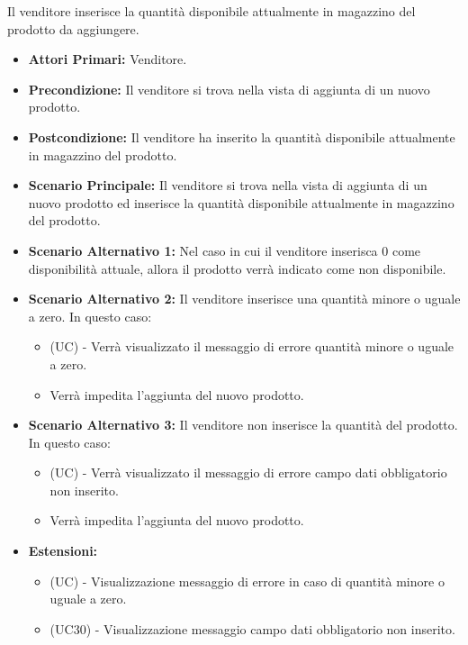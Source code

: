 Il venditore inserisce la quantità disponibile attualmente in magazzino del prodotto da aggiungere.
\begin{itemize}
    \item \textbf{Attori Primari:} Venditore.
    \item \textbf{Precondizione:} Il venditore si trova nella vista di aggiunta di un nuovo prodotto.
    \item \textbf{Postcondizione:} Il venditore ha inserito la quantità disponibile attualmente in magazzino del prodotto.
    \item \textbf{Scenario Principale:} Il venditore si trova nella vista di aggiunta di un nuovo prodotto ed inserisce la quantità disponibile attualmente in magazzino del prodotto.
    \item \textbf{Scenario Alternativo 1:} Nel caso in cui il venditore inserisca 0 come disponibilità attuale, allora il prodotto verrà indicato come non disponibile.
    \item \textbf{Scenario Alternativo 2:} Il venditore inserisce una quantità minore o uguale a zero. In questo caso:
    \begin{itemize}
        \item (UC) - Verrà visualizzato il messaggio di errore quantità minore o uguale a zero.
        \item Verrà impedita l'aggiunta del nuovo prodotto.
    \end{itemize}
    \item \textbf{Scenario Alternativo 3:} Il venditore non inserisce la quantità del prodotto. In questo caso:
    \begin{itemize}
        \item (UC) - Verrà visualizzato il messaggio di errore campo dati obbligatorio non inserito.
        \item Verrà impedita l'aggiunta del nuovo prodotto.
    \end{itemize}
    \item \textbf{Estensioni:}
        \begin{itemize}
            \item (UC) - Visualizzazione messaggio di errore in caso di quantità minore o uguale a zero.
            \item (UC30) - Visualizzazione messaggio campo dati obbligatorio non inserito.
        \end{itemize}
\end{itemize}

